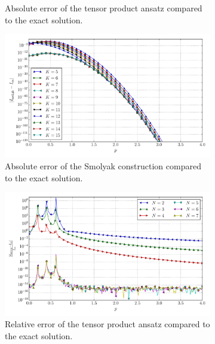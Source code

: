 \documentclass[a4paper,10pt]{article}
\begin{document}
\begin{figure}[ht!]
\begin{subfigure}[t]{0.5\linewidth}
    \caption{Absolute error of the tensor product ansatz compared to the exact solution.}
    \label{fig:tp_sg_3d_conv_p_444_444_err_nsd_tp}
  \end{subfigure}
  \begin{subfigure}[t]{0.5\linewidth}
    \includegraphics[width=\linewidth]{./plots/tp_sg_3d_conv_p_(4,4,4)_(4,4,4)_err_nsd_gk.pdf}
    \caption{Absolute error of the Smolyak construction compared to the exact solution.}
    \label{fig:tp_sg_3d_conv_p_444_444_err_nsd_gk}
  \end{subfigure}
  \begin{subfigure}[t]{0.5\linewidth}
    \includegraphics[width=\linewidth]{./plots/tp_sg_3d_conv_p_(4,4,4)_(4,4,4)_err_rel_nsd_tp.pdf}
    \caption{Relative error of the tensor product ansatz compared to the exact solution.}
    \label{fig:tp_sg_3d_conv_p_444_444_err_rel_nsd_tp}
  \end{subfigure}
  \begin{subfigure}[t]{0.5\linewidth}

\end{subfigure}
\end{figure}
\end{document}
